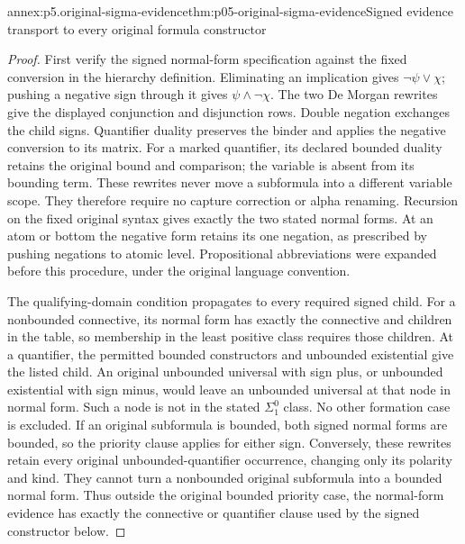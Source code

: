 \begin{annexitem}{annex:p5.original-sigma-evidence}{thm:p05-original-sigma-evidence}{Signed evidence transport to every original formula constructor}
\begin{proof}
First verify the signed normal-form specification against the fixed
conversion in the hierarchy definition. Eliminating an implication
gives \(\neg\psi\lor\chi\); pushing a negative sign through it
gives \(\psi\land\neg\chi\). The two De Morgan rewrites give
the displayed conjunction and disjunction rows. Double negation
exchanges the child signs. Quantifier duality preserves the binder
and applies the negative conversion to its matrix. For a marked
quantifier, its declared bounded duality retains the original bound
and comparison; the variable is absent from its bounding term.
These rewrites never move a subformula into a different variable
scope. They therefore require no capture correction or alpha
renaming. Recursion on the fixed original syntax gives exactly the
two stated normal forms. At an atom or bottom the negative form
retains its one negation, as prescribed by pushing negations to
atomic level. Propositional abbreviations were expanded before
this procedure, under the original language convention.

The qualifying-domain condition propagates to every required signed
child. For a nonbounded connective, its normal form has exactly
the connective and children in the table, so membership in the
least positive class requires those children. At a quantifier,
the permitted bounded constructors and unbounded existential give
the listed child. An original unbounded universal with sign plus,
or unbounded existential with sign minus, would leave an unbounded
universal at that node in normal form. Such a node is not in the
stated \(\Sigma^0_1\) class. No other formation case is excluded.
If an original subformula is bounded, both signed normal forms
are bounded, so the priority clause applies for either sign.
Conversely, these rewrites retain every original unbounded-quantifier
occurrence, changing only its polarity and kind. They cannot turn
a nonbounded original subformula into a bounded normal form.
Thus outside the original bounded priority case, the normal-form
evidence has exactly the connective or quantifier clause used by
the signed constructor below.


\end{proof}
\end{annexitem}
